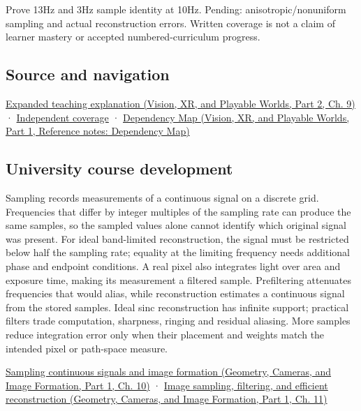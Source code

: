 Prove 13Hz and 3Hz sample identity at 10Hz. Pending: anisotropic/nonuniform sampling and actual reconstruction errors. Written coverage is not a claim of learner mastery or accepted numbered-curriculum progress.

\subsection{Source and navigation}\label{appendix-6a7869dd79a6-source-and-navigation}

\hypertarget{appendix-6a7869dd79a6-source-and-navigation}{}

\href{../07-Vision-XR-and-Playable-Worlds-P02/main.pdf\#04-visual-computing-ii-ch042-sampling-is-a-question-of-what-remains-distinguishable}{Expanded teaching explanation (Vision, XR, and Playable Worlds, Part 2, Ch. 9)} · \hyperref[appendix-fd090d982a15-xr01---independent-seeing-and-representation-source]{Independent coverage} · \href{../07-Vision-XR-and-Playable-Worlds-P01/main.pdf\#appendix-4ad47bdd269a}{Dependency Map (Vision, XR, and Playable Worlds, Part 1, Reference notes: Dependency Map)}

\subsection{University course development}\label{appendix-6a7869dd79a6-university-course-development}

\hypertarget{appendix-6a7869dd79a6-university-course-development}{}

Sampling records measurements of a continuous signal on a discrete grid. Frequencies that differ by integer multiples of the sampling rate can produce the same samples, so the sampled values alone cannot identify which original signal was present. For ideal band-limited reconstruction, the signal must be restricted below half the sampling rate; equality at the limiting frequency needs additional phase and endpoint conditions. A real pixel also integrates light over area and exposure time, making its measurement a filtered sample. Prefiltering attenuates frequencies that would alias, while reconstruction estimates a continuous signal from the stored samples. Ideal sinc reconstruction has infinite support; practical filters trade computation, sharpness, ringing and residual aliasing. More samples reduce integration error only when their placement and weights match the intended pixel or path-space measure.

\href{../03-Geometry-Cameras-and-Image-Formation-P01/main.pdf\#03-visual-computing-i-ch003-sampling-continuous-signals-and-image-formation}{Sampling continuous signals and image formation (Geometry, Cameras, and Image Formation, Part 1, Ch. 10)} · \href{../03-Geometry-Cameras-and-Image-Formation-P01/main.pdf\#03-visual-computing-i-ch004-image-sampling-filtering-and-efficient-reconstruction}{Image sampling, filtering, and efficient reconstruction (Geometry, Cameras, and Image Formation, Part 1, Ch. 11)}

